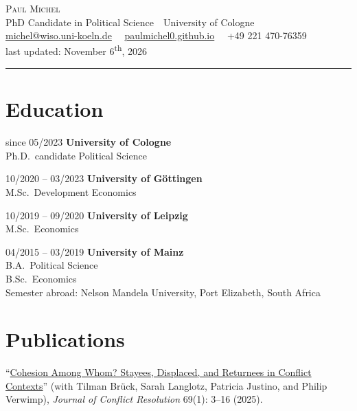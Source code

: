 \documentclass[a4paper,11pt]{article}
\newcommand{\cventry}[3]{%
  #2 \hfill \textbf{#1} \\
  #3\par\vspace{6pt}%
}
\begin{document}
\newcommand{\sep}{\ \textperiodcentered\ }

\begin{center}
  {\LARGE\scshape Paul Michel}\\[4pt]
  {\small PhD Candidate in Political Science\sep University of Cologne}\\[1pt]
  {\small \href{mailto:michel@wiso.uni-koeln.de}{michel@wiso.uni-koeln.de}\sep
          \href{https://paulmichel0.github.io}{paulmichel0.github.io}\sep
          +49 221 470-76359}\\[1pt]
  {\small last updated: November 6\textsuperscript{th}, 2026}\\[3pt]
  \rule{\textwidth}{0.4pt}
\end{center}

\section{Education}

\cventry{University of Cologne}{since 05/2023}{%
  Ph.D.\ candidate Political Science%
}

\cventry{University of G\"ottingen}{10/2020 -- 03/2023}{%
  M.Sc.\ Development Economics%
}

\cventry{University of Leipzig}{10/2019 -- 09/2020}{%
  M.Sc.\ Economics%
}

\cventry{University of Mainz}{04/2015 -- 03/2019}{%
  B.A.\ Political Science \\
  B.Sc.\ Economics \\
  \hspace*{1em}Semester abroad: Nelson Mandela University, Port Elizabeth, South Africa%
}

\section{Publications}

``{\href{https://doi.org/10.1177/00220027241254585}{Cohesion Among Whom? Stayees, Displaced, and Returnees in Conflict Contexts}}''
(with Tilman Br\"uck, Sarah Langlotz, Patricia Justino, and Philip Verwimp),
\textit{Journal of Conflict Resolution} 69(1): 3--16 (2025).

\vspace{6pt}

\end{document}
